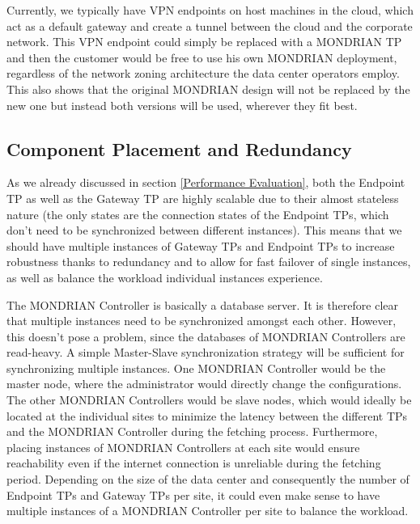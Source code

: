 Currently, we typically have \acs{VPN} endpoints on host machines in the cloud, which act as a default gateway and create a tunnel between the cloud and the corporate network. This \acs{VPN} endpoint could simply be replaced with a MONDRIAN \acs{TP} and then the customer would be free to use his own MONDRIAN deployment, regardless of the network zoning architecture the data center operators employ. This also shows that the original MONDRIAN design will not be replaced by the new one but instead both versions will be used, wherever they fit best.

\FloatBarrier
\subsection{Component Placement and Redundancy}
As we already discussed in section \ref{Performance Evaluation}, both the Endpoint \acs{TP} as well as the Gateway \acs{TP} are highly scalable due to their almost stateless nature (the only states are the connection states of the Endpoint \acsp{TP}, which don't need to be synchronized between different instances). This means that we should have multiple instances of Gateway \acsp{TP} and Endpoint \acsp{TP} to increase robustness thanks to redundancy and to allow for fast failover of single instances, as well as balance the workload individual instances experience.

The MONDRIAN Controller is basically a database server. It is therefore clear that multiple instances need to be synchronized amongst each other. However, this doesn't pose a problem, since the databases of MONDRIAN Controllers are read-heavy. A simple Master-Slave synchronization strategy will be sufficient for synchronizing multiple instances. One MONDRIAN Controller would be the master node, where the administrator would directly change the configurations. The other MONDRIAN Controllers would be slave nodes, which would ideally be located at the individual sites to minimize the latency between the different \acsp{TP} and the MONDRIAN Controller during the fetching process. Furthermore, placing instances of MONDRIAN Controllers at each site would ensure reachability even if the internet connection is unreliable during the fetching period. Depending on the size of the data center and consequently the number of Endpoint \acsp{TP} and Gateway \acsp{TP} per site, it could even make sense to have multiple instances of a  MONDRIAN Controller per site to balance the workload.

